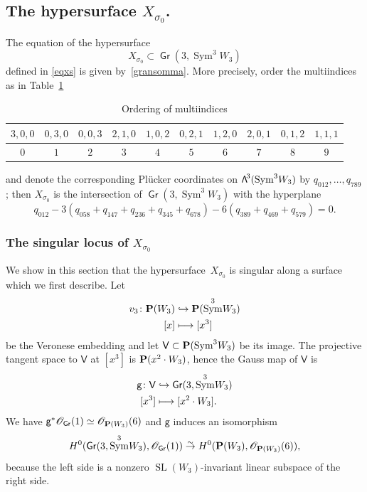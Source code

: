 \documentclass[11pt]{article}
\let\mathcal\mathscr
\newcommand\mto{\mathchoice{\longmapsto}{\mapsto}{\mapsto}{\mapsto}}
\newcommand\hto{\mathrel{\lhook\joinrel\to}}
\newcommand{\isomlra}{\stackrel{{}_{\scriptstyle\sim}}{\to}}
\theoremstyle{definition}
\newcommand\cO{\mathcal{O}}\let\OO\cO
\newcommand\sfV{\mathsf{V}}
\DeclareMathOperator{\Gr}{\mathsf{Gr}}
\let\cong\simeq
\DeclareMathOperator{\Sym}{Sym}
\DeclareMathOperator{\SL}{SL}
\newcommand\bw[1]{{\hbox{\large$\mathsf{\Lambda}$}^{\!#1}}}
\begin{document}
\subsection{The hypersurface $X_{\sigma_0}$.}\label{effezero}

The equation of the hypersurface
\[
X_{\sigma_0}\subset \Gr(3,\Sym^3\! W_{3})
\]
defined in \eqref{eqxs} is given by~\eqref{gransomma}. More precisely, order the multiindices as in
Table~\ref{enumero}
\begin{table}[htb!]
\renewcommand\arraystretch{1.5}
\begin{tabular}{| c | c | c | c | c | c | c | c | c | c |}
\hline
$ 3,0,0$ & $ 0,3,0$ & $ 0,0,3$ & $ 2,1,0$ & $ 1,0,2$ & $ 0,2,1$ & $ 1,2,0$ &
$ 2,0,1$ & $ 0,1,2$ & $ 1,1,1$ \\
\hline
$ 0$ & $ 1$ & $ 2$ & $ 3$ & $ 4$ & $ 5$ & $ 6$ & $ 7$ &
$ 8$ & $ 9$ \\
\hline
\end{tabular}
\vspace{\baselineskip}
\caption{Ordering of multiindices}\label{enumero}
\vspace{-\baselineskip}
\end{table}
and denote the corresponding Plücker coordinates on $\bw3(\Sym^3\! W_{3})$ by $q_{012},\ldots,q_{789}$; then $X_{\sigma_0}$ is the intersection of $\Gr(3,\Sym^3\! W_{3})$ with the hyperplane
\begin{equation}\label{tagliograss}
q_{012}- 3 (q_{058}+q_{147}+ q_{236}+q_{345}+q_{678})-6(q_{389}+q_{469}+q_{579})=0.
\end{equation}

\subsubsection{The singular locus of $X_{\sigma_0}$}

We show in this section that the hypersurface~$X_{\sigma_0}$ is singular along a surface which we first describe. Let
\begin{align*}
v_3\colon\PP(W_3) & \hto \PP(\Sym^3\! W_3) \\
{[}x] & \mto [x^3]
\end{align*}
be the Veronese embedding and let $\sfV\subset\PP(\Sym^3\! W_3)$ be its image. The projective tangent space to $\sfV$ at $[x^3]$
is $\PP(x^2\cdot W_3)$, hence the Gauss map of $\sfV$ is
\begin{equation}
\begin{split}\label{mappagauss}
{\mathsf g}\colon \sfV & \hto \Gr(3,\Sym^3\! W_3) \\
{[}x^3] & \mto [x^2\cdot W_3].
\end{split}
\end{equation}
We have ${\mathsf g}^{*}\cO_{\Gr}(1)\cong \cO_{\PP(W_3)}(6)$ and ${\mathsf g}$ induces an isomorphism
\begin{equation}\label{isomo}
H^0(\Gr(3,\Sym^3\! W_3),\cO_{\Gr}(1))\isomlra H^0(\PP(W_3),\cO_{\PP(W_3)}(6)),
\end{equation}
because the left side
is a nonzero $\SL(W_3)$-invariant linear subspace of the right side.
\end{document}
